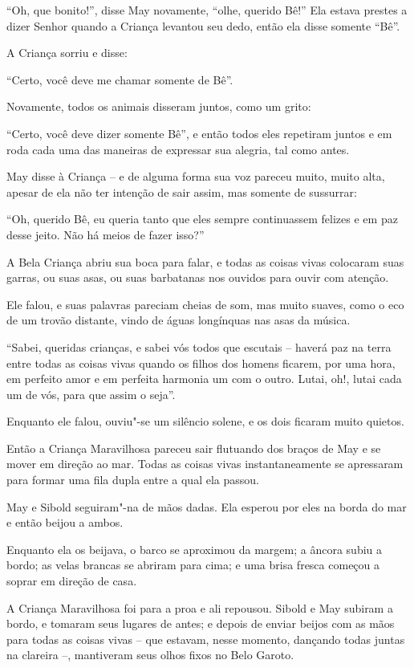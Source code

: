 ``Oh, que bonito!'', disse May novamente, ``olhe, querido Bê!'' Ela
estava prestes a dizer Senhor quando a Criança levantou seu dedo, então
ela disse somente ``Bê''.

A Criança sorriu e disse:

``Certo, você deve me chamar somente de Bê''.

Novamente, todos os animais disseram juntos, como um grito:

``Certo, você deve dizer somente Bê'', e então todos eles
repetiram juntos e em roda cada uma das maneiras de expressar sua
alegria, tal como antes.

May disse à Criança -- e de alguma forma sua voz pareceu muito, muito
alta, apesar de ela não ter intenção de sair assim, mas somente de
sussurrar:

``Oh, querido Bê, eu queria tanto que eles sempre continuassem felizes e
em paz desse jeito. Não há meios de fazer isso?''

A Bela Criança abriu sua boca para falar, e todas as coisas vivas
colocaram suas garras, ou suas asas, ou suas barbatanas nos ouvidos para
ouvir com atenção.

Ele falou, e suas palavras pareciam cheias de som, mas muito suaves,
como o eco de um trovão distante, vindo de águas longínquas nas asas da
música.

``Sabei, queridas crianças, e sabei vós todos que escutais -- haverá paz
na terra entre todas as coisas vivas quando os filhos dos homens
ficarem, por uma hora, em perfeito amor e em perfeita harmonia um com o
outro. Lutai, oh!, lutai cada um de vós, para que assim o seja''.

Enquanto ele falou, ouviu"-se um silêncio solene, e os dois ficaram muito
quietos.

Então a Criança Maravilhosa pareceu sair flutuando dos braços de May e
se mover em direção ao mar. Todas as coisas vivas instantaneamente se
apressaram para formar uma fila dupla entre a qual ela passou.

May e Sibold seguiram"-na de mãos dadas. Ela esperou por eles na borda do
mar e então beijou a ambos.

Enquanto ela os beijava, o barco se aproximou da margem; a âncora subiu
a bordo; as velas brancas se abriram para cima; e uma brisa fresca
começou a soprar em direção de casa.

A Criança Maravilhosa foi para a proa e ali repousou. Sibold e May
subiram a bordo, e tomaram seus lugares de antes; e depois de enviar
beijos com as mãos para todas as coisas vivas -- que estavam, nesse
momento, dançando todas juntas na clareira --, mantiveram seus olhos
fixos no Belo Garoto.

